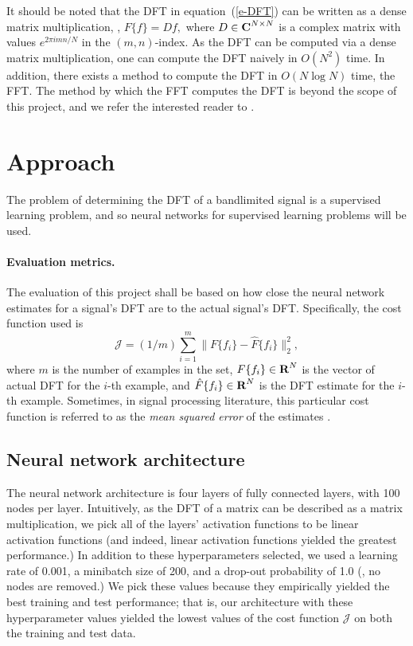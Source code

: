 \documentclass[12pt]{article}
\begin{document}
It should be noted that the DFT in equation~(\ref{e-DFT}) can be written as a dense matrix multiplication, \ie,
$F\{f\} = D f,$ where $D \in {\mbox{\bf C}}^{N \times N}$ is a complex matrix with values $e^{2 \pi i m n / N}$ in 
the $(m,n)$-index. As the DFT can be computed via a dense matrix multiplication, one can compute the DFT naively
in $O(N^2)$ time. In addition, there exists a method to compute the DFT in $O(N \log N)$ time, the FFT. The method 
by which the FFT computes the DFT is beyond the scope of this project, and we refer the interested reader to 
\cite{CT:65}.


\section{Approach} \label{s-approach}
The problem of determining the DFT of a bandlimited signal is a supervised learning problem, and so
neural networks for supervised learning problems will be used.

\paragraph{Evaluation metrics.}
The evaluation of this project shall be based on how close the neural network estimates for 
a signal's DFT are to the actual signal's DFT. Specifically, the cost function used is
\[
\mathcal J = (1/m) \sum_{i = 1}^{m} \|F\{f_i\} - \hat{F}\{f_i\} \|_2^2,
\]
where $m$ is the number of examples in the set, $F\{f_i\} \in {\mbox{\bf R}}^N$ is the vector of actual DFT 
for the $i$-th example, and $\hat{F}\{f_i\} \in {\mbox{\bf R}}^N$ is the DFT estimate for the $i$-th example. 
Sometimes, in signal processing literature, this particular cost function is referred to as the 
\emph{mean squared error} of the estimates \cite{DG:10}.

\subsection{Neural network architecture} The neural network architecture is four layers of 
fully connected layers, with 100 nodes per layer. Intuitively, as the DFT of a matrix can be described 
as a matrix multiplication, we pick all of the layers' activation functions to be linear activation 
functions (and indeed, linear activation functions yielded the greatest performance.) In addition to these 
hyperparameters selected, we used a learning rate of 0.001, a minibatch size of 200, and a drop-out 
probability of 1.0 (\ie, no nodes are removed.) We pick these values because they empirically yielded 
the best training and test performance; that is, our architecture with these hyperparameter values 
yielded the lowest values of the cost function $\mathcal J$ on both the training and test data.
\end{document}
